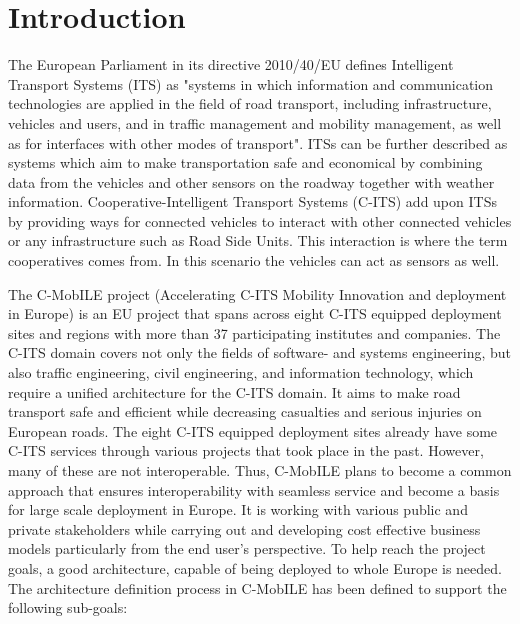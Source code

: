 \documentclass[conference]{IEEEtran}
\begin{document}
\section{Introduction}

The European Parliament in its directive 2010/40/EU \cite{ec} defines Intelligent Transport Systems (ITS) as "systems in which information and communication technologies are applied in the field of road transport, including infrastructure, vehicles and users, and in traffic management and mobility management, as well as for interfaces with other modes of transport".
ITSs can be further described as systems which aim to make transportation safe and economical by combining data from the vehicles and other sensors on the roadway together with weather information.
Cooperative-Intelligent Transport Systems (C-ITS) \cite{c-its} add upon ITSs by providing ways for connected vehicles to interact with other connected vehicles or any infrastructure such as Road Side Units.
This interaction is where the term cooperatives comes from.
In this scenario the vehicles can act as sensors as well.

The C-MobILE project (Accelerating C-ITS Mobility Innovation and deployment in Europe) is an EU project that spans across eight C-ITS equipped deployment sites and regions with more than 37 participating institutes and companies.
The C-ITS domain covers not only the fields of software- and systems engineering, but also traffic engineering, civil engineering, and information technology, which require a unified architecture for the C-ITS domain.
It aims to make road transport safe and efficient while decreasing casualties and serious injuries on European roads.
The eight C-ITS equipped deployment sites already have some C-ITS services through various projects that took place in the past.
However, many of these are not interoperable.
Thus, C-MobILE plans to become a common approach that ensures interoperability with seamless service and become a basis for large scale deployment in Europe.
It is working with various public and private stakeholders while carrying out and developing cost effective business models particularly from the end user’s perspective.
To help reach the project goals, a good architecture, capable of being deployed to whole Europe is needed.
The architecture definition process in C-MobILE has been defined to support the following sub-goals:
\end{document}
